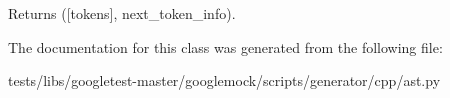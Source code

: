 \begin{DoxyVerb}Returns ([tokens], next_token_info).\end{DoxyVerb}
 

The documentation for this class was generated from the following file\+:\begin{DoxyCompactItemize}
\item 
tests/libs/googletest-\/master/googlemock/scripts/generator/cpp/ast.\+py\end{DoxyCompactItemize}
